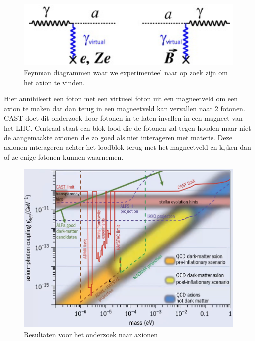 \documentclass[../main.tex]{subfiles}
\begin{document}
\begin{figure}[h]
    \centering
    \includegraphics[width=0.4\linewidth]{physics_beyond_the_standard_model/axion_diagrammen.png}
    \caption{Feynman diagrammen waar we experimenteel naar op zoek zijn om het axion te vinden.}%
    \label{fig:physics_beyond_the_standard_model/axion_diagrammen}
\end{figure}

Hier annihileert een foton met een virtueel foton uit een magneetveld om een axion te maken dat dan terug in een magneetveld kan vervallen naar 2 fotonen. CAST doet dit onderzoek door fotonen in te laten invallen in een magneet van het LHC. Centraal staat een blok lood die de fotonen zal tegen houden maar niet de aangemaakte axionen die zo goed als niet interageren met materie. Deze axionen interageren achter het loodblok terug met het magneetveld en kijken dan of ze enige fotonen kunnen waarnemen.

\begin{figure}[h]
    \centering
    \includegraphics[width=0.6\linewidth]{physics_beyond_the_standard_model/cast_resultaten.png}
    \caption{Resultaten voor het onderzoek naar axionen}%
    \label{fig:physics_beyond_the_standard_model/cast_resultaten}
\end{figure}
\end{document}
